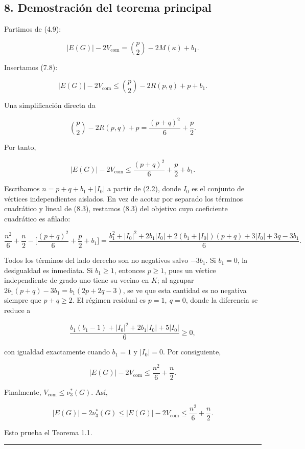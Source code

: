 \documentclass[spanish,11pt,a4paper]{article}
\begin{document}
\subsection{8. Demostración del teorema
principal}\label{demostraciuxf3n-del-teorema-principal}

Partimos de (4.9):

\[
|E(G)|-2V_{\mathrm{com}}
=
\binom p2-2M(\kappa)+b_1.
\]

Insertamos (7.8):

\[
|E(G)|-2V_{\mathrm{com}}
\le
\binom p2-2R(p,q)+p+b_1.
\tag{8.1}
\]

Una simplificación directa da

\[
\binom p2-2R(p,q)+p
=
\frac{(p+q)^2}{6}+\frac p2.
\tag{8.2}
\]

Por tanto,

\[
|E(G)|-2V_{\mathrm{com}}
\le
\frac{(p+q)^2}{6}+\frac p2+b_1.
\tag{8.3}
\]

Escribamos \(n=p+q+b_1+|I_0|\) a partir de (2.2), donde \(I_0\) es el
conjunto de vértices independientes aislados. En vez de acotar por
separado los términos cuadrático y lineal de (8.3), restamos (8.3) del
objetivo cuyo coeficiente cuadrático es afilado:

\[
\frac{n^2}{6}+\frac n2-\Big[\frac{(p+q)^2}{6}+\frac p2+b_1\Big]
=
\frac{b_1^2+|I_0|^2+2b_1|I_0|+2(b_1+|I_0|)(p+q)+3|I_0|+3q-3b_1}{6}.
\]

Todos los términos del lado derecho son no negativos salvo \(-3b_1\). Si
\(b_1=0\), la desigualdad es inmediata. Si \(b_1\ge1\), entonces
\(p\ge1\), pues un vértice independiente de grado uno tiene su vecino en
\(K\); al agrupar \(2b_1(p+q)-3b_1=b_1(2p+2q-3)\), se ve que esta
cantidad es no negativa siempre que \(p+q\ge2\). El régimen residual es
\(p=1,\ q=0\), donde la diferencia se reduce a

\[
\frac{b_1(b_1-1)+|I_0|^2+2b_1|I_0|+5|I_0|}{6}\ge0,
\]

con igualdad exactamente cuando \(b_1=1\) y \(|I_0|=0\). Por
consiguiente,

\[
|E(G)|-2V_{\mathrm{com}}
\le
\frac{n^2}{6}+\frac n2.
\tag{8.4}
\]

Finalmente, \(V_{\mathrm{com}}\le\nu_3^*(G)\). Así,

\[
|E(G)|-2\nu_3^*(G)
\le
|E(G)|-2V_{\mathrm{com}}
\le
\frac{n^2}{6}+\frac n2.
\]

Esto prueba el Teorema 1.1.

\begin{center}\rule{0.5\linewidth}{0.5pt}\end{center}
\end{document}
